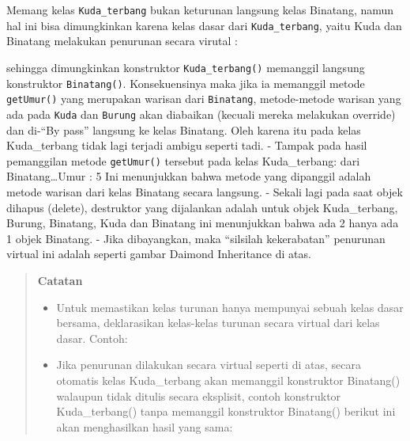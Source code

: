 Memang kelas \texttt{Kuda\_terbang} bukan keturunan langsung kelas
Binatang, namun hal ini bisa dimungkinkan karena kelas dasar dari
\texttt{Kuda\_terbang}, yaitu Kuda dan Binatang melakukan penurunan
secara virutal :



sehingga dimungkinkan konstruktor \texttt{Kuda\_terbang()} memanggil
langsung konstruktor \texttt{Binatang()}. Konsekuensinya maka jika ia
memanggil metode \texttt{getUmur()} yang merupakan warisan dari
\texttt{Binatang}, metode-metode warisan yang ada pada \texttt{Kuda} dan
\texttt{Burung} akan diabaikan (kecuali mereka melakukan override) dan
di-``By pass'' langsung ke kelas Binatang. Oleh karena itu pada kelas
Kuda\_terbang tidak lagi terjadi ambigu seperti tadi. - Tampak pada
hasil pemanggilan metode \texttt{getUmur()} tersebut pada kelas
Kuda\_terbang: dari Binatang\ldots{}Umur : 5 Ini menunjukkan bahwa
metode yang dipanggil adalah metode warisan dari kelas Binatang secara
langsung. - Sekali lagi pada saat objek dihapus (delete), destruktor
yang dijalankan adalah untuk objek Kuda\_terbang, Burung, Binatang, Kuda
dan Binatang ini menunjukkan bahwa ada 2 hanya ada 1 objek Binatang. -
Jika dibayangkan, maka ``silsilah kekerabatan'' penurunan virtual ini
adalah seperti gambar Daimond Inheritance di atas.

\begin{quotation}
 {\LARGE {}} \textbf{Catatan}

\begin{itemize}
\item [\ding{45}] Untuk memastikan kelas turunan hanya mempunyai sebuah kelas dasar bersama,
deklarasikan kelas-kelas turunan secara virtual dari kelas dasar. Contoh:



\item [\ding{45}] Jika penurunan dilakukan secara virtual seperti di atas, secara otomatis kelas
Kuda\_terbang akan memanggil konstruktor Binatang() walaupun tidak ditulis
secara eksplisit, contoh konstruktor Kuda\_terbang() tanpa memanggil konstruktor
Binatang() berikut ini akan menghasilkan hasil yang sama:


\end{itemize}

\end{quotation}




